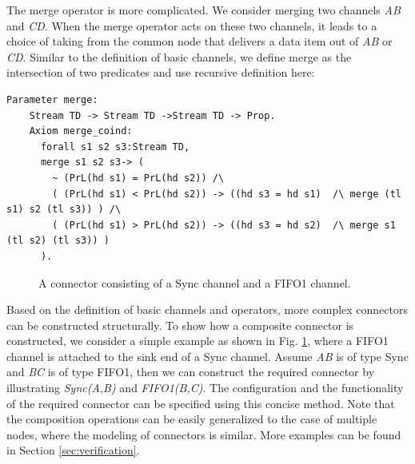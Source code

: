\documentclass[preprint,3p]{elsarticle}
\begin{document}
The merge operator is more complicated. We consider merging two
channels \emph{AB} and \emph{CD}. When the merge operator acts on
these two channels, it leads to a choice of taking from the common
node that delivers a data item out of \emph{AB} or \emph{CD}.
Similar to the definition of basic channels, we define merge as the intersection of two predicates and use recursive definition here:
\begin{lstlisting}[language=coq]
    Parameter merge:
    Stream TD -> Stream TD ->Stream TD -> Prop.
    Axiom merge_coind:
      forall s1 s2 s3:Stream TD,
      merge s1 s2 s3-> (
        ~ (PrL(hd s1) = PrL(hd s2)) /\
        ( (PrL(hd s1) < PrL(hd s2)) -> ((hd s3 = hd s1)  /\ merge (tl s1) s2 (tl s3)) ) /\
        ( (PrL(hd s1) > PrL(hd s2)) -> ((hd s3 = hd s2)  /\ merge s1 (tl s2) (tl s3)) )
      ).
\end{lstlisting}

\begin{figure}
\vspace{0cm}
\centering
{}
\caption{A connector consisting of a Sync channel and a FIFO1 channel.}\label{fig:compsyncfifo}
\end{figure}

Based on the definition of basic channels and operators, more complex connectors can be constructed structurally.
To show how a composite connector is constructed, we consider a simple example as shown in Fig. \ref{fig:compsyncfifo}, where a FIFO1 channel is attached
to the sink end of a Sync channel. Assume \emph{AB} is of type Sync and \emph{BC} is of type FIFO1, then we can construct the required connector by
illustrating \emph{Sync(A,B)} and \emph{FIFO1(B,C)}. The configuration and the functionality of the required connector can be specified using this concise method. Note that the composition operations can be easily generalized to the case of multiple nodes, where the modeling of connectors is similar. More
examples can be found in Section \ref{sec:verification}.
\end{document}
